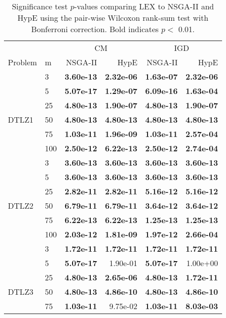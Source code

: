 \begin{table}[ht]
\centering
\caption{Significance test $p$-values comparing LEX to NSGA-II and HypE using the pair-wise Wilcoxon rank-sum test with Bonferroni correction. Bold indicates $p<$ 0.01.}
\label{tbl:wilcox}
\begingroup\footnotesize
\begin{tabular}{l l r r r r}
\toprule
&& \multicolumn{2}{c}{CM} & \multicolumn{2}{c}{IGD} \\Problem & m & NSGA-II & HypE & NSGA-II & HypE\\ 
 \midrule
&	3	&	\textbf{3.60e-13}&\textbf{2.32e-06}&\textbf{1.63e-07}&\textbf{2.32e-06}\\ 
&	5	&	\textbf{5.07e-17}&\textbf{1.29e-07}&\textbf{6.09e-16}&\textbf{1.63e-04}\\ 
&	25	&	\textbf{4.80e-13}&\textbf{1.90e-07}&\textbf{4.80e-13}&\textbf{1.90e-07}\\ 
DTLZ1&	50	&	\textbf{4.80e-13}&\textbf{4.80e-13}&\textbf{4.80e-13}&\textbf{4.80e-13}\\ 
&	75	&	\textbf{1.03e-11}&\textbf{1.96e-09}&\textbf{1.03e-11}&\textbf{2.57e-04}\\ 
&	100	&	\textbf{2.50e-12}&\textbf{6.22e-13}&\textbf{2.50e-12}&\textbf{2.74e-04}\\ 
\midrule 
&	3	&	\textbf{3.60e-13}&\textbf{3.60e-13}&\textbf{3.60e-13}&\textbf{3.60e-13}\\ 
&	5	&	\textbf{3.60e-13}&\textbf{3.60e-13}&\textbf{3.60e-13}&\textbf{3.60e-13}\\ 
&	25	&	\textbf{2.82e-11}&\textbf{2.82e-11}&\textbf{5.16e-12}&\textbf{5.16e-12}\\ 
DTLZ2&	50	&	\textbf{6.79e-11}&\textbf{6.79e-11}&\textbf{3.64e-12}&\textbf{3.64e-12}\\ 
&	75	&	\textbf{6.22e-13}&\textbf{6.22e-13}&\textbf{1.25e-13}&\textbf{1.25e-13}\\ 
&	100	&	\textbf{2.03e-12}&\textbf{1.81e-09}&\textbf{1.97e-12}&\textbf{2.66e-04}\\ 
\midrule 
&	3	&	\textbf{1.72e-11}&\textbf{1.72e-11}&\textbf{1.72e-11}&\textbf{1.72e-11}\\ 
&	5	&	\textbf{5.07e-17}&1.90e-01&\textbf{5.07e-17}&1.00e+00\\ 
&	25	&	\textbf{4.80e-13}&\textbf{2.65e-06}&\textbf{4.80e-13}&\textbf{1.72e-11}\\ 
DTLZ3&	50	&	\textbf{4.80e-13}&\textbf{4.86e-10}&\textbf{4.80e-13}&\textbf{4.86e-10}\\ 
&	75	&	\textbf{1.03e-11}&9.75e-02&\textbf{1.03e-11}&\textbf{8.03e-03}\\ 

\end{tabular}
\end{table}
